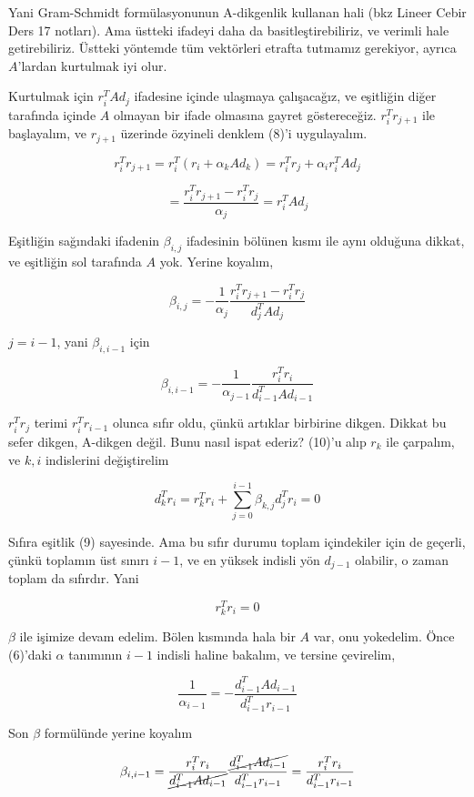 \documentclass[12pt,fleqn]{article}\usepackage{../../common}
\begin{document}
Yani Gram-Schmidt formülasyonunun A-dikgenlik kullanan hali (bkz Lineer
Cebir Ders 17 notları). Ama üstteki ifadeyi daha da basitleştirebiliriz, ve
verimli hale getirebiliriz. Üstteki yöntemde tüm vektörleri etrafta
tutmamız gerekiyor, ayrıca $A$'lardan kurtulmak iyi olur. 

Kurtulmak için $r_i^TAd_j$ ifadesine içinde ulaşmaya çalışacağız, ve
eşitliğin diğer tarafında içinde $A$ olmayan bir ifade olmasına gayret
göstereceğiz. $r_i^Tr_{j+1}$ ile başlayalım, ve $r_{j+1}$ üzerinde özyineli
denklem (8)'i uygulayalım. 

$$ r_i^Tr_{j+1} = r_i^T (r_i + \alpha_k A d_k)  = r_i^Tr_j + \alpha_i r_i^TAd_j $$

$$ = \frac{ r_i^Tr_{j+1} - r_i^Tr_j }{\alpha_j} =  r_i^TAd_j $$

Eşitliğin sağındaki ifadenin $\beta_{i,j}$ ifadesinin bölünen kısmı ile
aynı olduğuna dikkat, ve eşitliğin sol tarafında $A$ yok. Yerine koyalım, 

$$ \beta_{i,j} = - \frac{ 1}{\alpha_j}\frac{  r_i^Tr_{j+1} - r_i^Tr_j }{d_j^TAd_j} $$

$j = i -1$, yani $\beta_{i,i-1}$ için

$$ \beta_{i,i-1} = - \frac{ 1}{\alpha_{j-1}}\frac{  r_i^Tr_i  }{d_{i-1}^TAd_{i-1}} $$

$r_i^Tr_j$ terimi $r_i^Tr_{i-1}$ olunca sıfır oldu, çünkü artıklar
birbirine dikgen.  Dikkat bu sefer dikgen, A-dikgen değil. Bunu
nasıl ispat ederiz?  (10)'u alıp $r_k$ ile çarpalım, ve $k,i$ indislerini
değiştirelim

$$ d_k^Tr_i = r_k^Tr_i + \sum_{ j=0}^{i-1} \beta_{k,j}d_j ^Tr_i = 0
$$

Sıfıra eşitlik (9) sayesinde. Ama bu sıfır durumu toplam içindekiler için
de geçerli, çünkü toplamın üst sınırı $i-1$, ve en yüksek indisli yön
$d_{j-1}$ olabilir, o zaman toplam da sıfırdır. Yani

$$  r_k^Tr_i  = 0 $$

$\beta$ ile işimize devam edelim. Bölen kısmında hala bir $A$ var, onu
yokedelim. Önce (6)'daki $\alpha$ tanımının $i-1$ indisli haline bakalım, ve
tersine çevirelim, 

$$ \frac{ 1}{\alpha_{i-1}} = -\frac{d_{i-1}^T A d_{i-1} }{d_{i-1}^Tr_{i-1}} 
$$

Son $\beta$ formülünde yerine koyalım

$$ \beta_{i,i-1} = 
\frac{  r_i^Tr_i  }{ \cancel{d_{i-1}^TAd_{i-1}}} 
\frac{\cancel{d_{i-1}^T A d_{i-1}}}{d_{i-1}^Tr_{i-1}}
= 
\frac{  r_i^Tr_i  }{d_{i-1}^Tr_{i-1}}
$$
\end{document}
